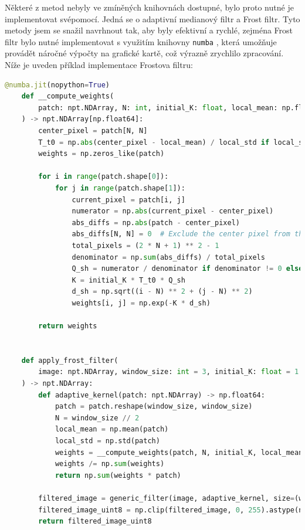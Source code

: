 \documentclass[male,czech,api_ing]{thesis}
\begin{document}
Některé z metod nebyly ve zmíněných knihovnách dostupné, bylo proto nutné je implementovat svépomocí. Jedná se o adaptivní medianový filtr a Frost filtr. Tyto metody jsem se snažil navrhnout tak, aby byly efektivní a rychlé, zejména Frost filtr bylo nutné implementovat s využitím knihovny \texttt{numba} \cite{numba}, která umožňuje provádět náročné výpočty na grafické kartě, což výrazně zrychlilo zpracování. Níže je uveden příklad implementace Frostova filtru:

\begin{lstlisting}[language=Python, caption={Implementace Frost filtru s využitím Numba CUDA}, label={lst:frost_filter}]
    @numba.jit(nopython=True)
    def __compute_weights(
        patch: npt.NDArray, N: int, initial_K: float, local_mean: np.float64, local_std: np.float64
    ) -> npt.NDArray[np.float64]:
        center_pixel = patch[N, N]
        T_t0 = np.abs(center_pixel - local_mean) / local_std if local_std != 0 else 0
        weights = np.zeros_like(patch)
    
        for i in range(patch.shape[0]):
            for j in range(patch.shape[1]):
                current_pixel = patch[i, j]
                numerator = np.abs(current_pixel - center_pixel)
                abs_diffs = np.abs(patch - center_pixel)
                abs_diffs[N, N] = 0  # Exclude the center pixel from the sum
                total_pixels = (2 * N + 1) ** 2 - 1
                denominator = np.sum(abs_diffs) / total_pixels
                Q_sh = numerator / denominator if denominator != 0 else 0
                K = initial_K * T_t0 * Q_sh
                d_sh = np.sqrt((i - N) ** 2 + (j - N) ** 2)
                weights[i, j] = np.exp(-K * d_sh)
        
        return weights
    
    
    def apply_frost_filter(
        image: npt.NDArray, window_size: int = 3, initial_K: float = 1.0
    ) -> npt.NDArray:
        def adaptive_kernel(patch: npt.NDArray) -> np.float64:
            patch = patch.reshape(window_size, window_size)
            N = window_size // 2
            local_mean = np.mean(patch)
            local_std = np.std(patch)
            weights = __compute_weights(patch, N, initial_K, local_mean, local_std)
            weights /= np.sum(weights)
            return np.sum(weights * patch)
    
        filtered_image = generic_filter(image, adaptive_kernel, size=(window_size, window_size))
        filtered_image_uint8 = np.clip(filtered_image, 0, 255).astype(np.uint8)
        return filtered_image_uint8
\end{lstlisting}
\end{document}

